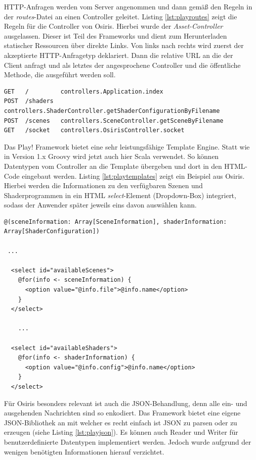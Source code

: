 HTTP-Anfragen werden vom Server angenommen und dann gemäß den Regeln in der \textit{routes}-Datei an einen Controller geleitet. Listing \ref{lst:playroutes} zeigt die Regeln für die Controller von Osiris. Hierbei wurde der \textit{Asset-Controller} ausgelassen. Dieser ist Teil des Frameworks und dient zum Herunterladen statischer Ressourcen über direkte Links. Von links nach rechts wird zuerst der akzeptierte HTTP-Anfragetyp deklariert. Dann die relative URL an die der Client anfragt und als letztes der angesprochene Controller und die öffentliche Methode, die ausgeführt werden soll.
\lstset{language=Scala}
\begin{lstlisting}[caption={Regeln für das Weiterleiten von HTTP-Anfragen an Controller}, label={lst:playroutes}]
GET   /         controllers.Application.index
POST  /shaders  controllers.ShaderController.getShaderConfigurationByFilename
POST  /scenes   controllers.SceneController.getSceneByFilename
GET   /socket   controllers.OsirisController.socket
\end{lstlisting}
Das Play! Framework bietet eine sehr leistungsfähige Template Engine. Statt wie in Version 1.x Groovy wird jetzt auch hier Scala verwendet. So können Datentypen vom Controller an die Template übergeben und dort in den HTML-Code eingebaut werden. Listing \ref{lst:playtemplates} zeigt ein Beispiel aus Osiris. Hierbei werden die Informationen zu den verfügbaren Szenen und Shaderprogrammen in ein HTML \textit{select}-Element (Dropdown-Box) integriert, sodass der Anwender später jeweils eins davon auswählen kann.
\lstset{language=HTML}
\begin{lstlisting}[caption={Integrieren der Informationen zu den verfügbaren Szenen und Shadern in ein HTML Select-Element}, label={lst:playtemplates}]
@(sceneInformation: Array[SceneInformation], shaderInformation: Array[ShaderConfiguration])

 ...

  <select id="availableScenes">
    @for(info <- sceneInformation) {
      <option value="@info.file">@info.name</option>
    }
  </select>

    ...

  <select id="availableShaders">
    @for(info <- shaderInformation) {
      <option value="@info.config">@info.name</option>
    }
  </select>
\end{lstlisting}
Für Osiris besonders relevant ist auch die JSON-Behandlung, denn alle ein- und ausgehenden Nachrichten sind so enkodiert. Das Framework bietet eine eigene JSON-Bibliothek an mit welcher es recht einfach ist JSON zu parsen oder zu erzeugen (siehe Listing \ref{lst:playjson}). Es können auch Reader und Writer für benutzerdefinierte Datentypen implementiert werden. Jedoch wurde aufgrund der wenigen benötigten Informationen hierauf verzichtet.
